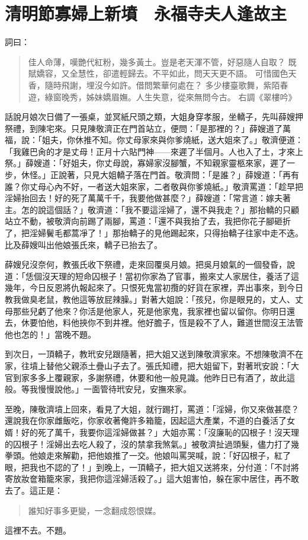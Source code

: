 
\chapter{清明節寡婦上新墳　永福寺夫人逢故主}

詞曰：
\begin{quote}
佳人命薄，嘆艷代紅粉，幾多黃土。豈是老天渾不管，好惡隨人自取？
既賦嬌容，又全慧性，卻遣輕歸去。不平如此，問天天更不語。
可惜國色天香，隨時飛謝，埋沒今如許。借問繁華何處在？
多少樓臺歌舞，紫陌春遊，綠窗晚秀，姊妹嬌眉嫵。人生失意，從來無問今古。
右調《翠樓吟》
\end{quote}

話說月娘次日備了一張桌，並冥紙尺頭之類，大姐身穿孝服，坐轎子，先叫薛嫂押祭禮，到陳宅來。只見陳敬濟正在門首站立，便問：「是那裡的？」薛嫂道了萬福，說：「姐夫，你休推不知。你丈母家來與你爹燒紙，送大姐來了。」敬濟便道：「我雞巴肏的才是丈母！正月十六貼門神——來遲了半個月。人也入了土，才來上祭。」薛嫂道：「好姐夫，你丈母說，寡婦家沒腳蟹，不知親家靈柩來家，遲了一步，休怪。」正說著，只見大姐轎子落在門首。敬濟問：「是誰？」薛嫂道：「再有誰？你丈母心內不好，一者送大姐來家，二者敬與你爹燒紙。」敬濟罵道：「趁早把淫婦抬回去！好的死了萬萬千千，我要他做甚麼？」薛嫂道：「常言道：嫁夫著主。怎的說這個話？」敬濟道：「我不要這淫婦了，還不與我走？」那抬轎的只顧站立不動，被敬濟向前踢了兩腳，罵道：「還不與我抬了去，我把你花子腳砸折了，把淫婦鬢毛都蒿凈了！」那抬轎子的見他踢起來，只得抬轎子往家中走不迭。比及薛嫂叫出他娘張氏來，轎子已抬去了。

薛嫂兒沒奈何，教張氏收下祭禮，走來回覆吳月娘。把吳月娘氣的一個發昏，說道：「恁個沒天理的短命囚根子！當初你家為了官事，搬來丈人家居住，養活了這幾年，今日反恩將仇報起來了。只恨死鬼當初攬的好貨在家裡，弄出事來，到今日教我做臭老鼠，教他這等放屁辣臊。」對著大姐說：「孩兒，你是眼見的，丈人、丈母那些兒虧了他來？你活是他家人，死是他家鬼，我家裡也留以留你。你明日還去，休要怕他，料他挾你不到井裡。他好膽子，恆是殺不了人，難道世間沒王法管他也怎的！」當晚不題。

到次日，一頂轎子，教玳安兒跟隨著，把大姐又送到陳敬濟家來。不想陳敬濟不在家，往墳上替他父親添土疊山子去了。張氏知禮，把大姐留下，對著玳安說：「大官到家多多上覆親家，多謝祭禮，休要和他一般見識。他昨日已有酒了，故此這般。等我慢慢說他。」一面管待玳安兒，安撫來家。

至晚，陳敬濟墳上回來，看見了大姐，就行踢打，罵道：「淫婦，你又來做甚麼？還說我在你家雌飯吃，你家收著俺許多箱籠，因起這大產業，不道的白養活了女婿！好的死了萬千，我要你這淫婦做甚？」大姐亦罵：「沒廉恥的囚根子！沒天理的囚根子！淫婦出去吃人殺了，沒的禁拿我煞氣。」被敬濟扯過頭髮，儘力打了幾拳頭。他娘走來解勸，把他娘推了一交。他娘叫罵哭喊，說：「好囚根子，紅了眼，把我也不認的了！」到晚上，一頂轎子，把大姐又送將來，分付道：「不討將寄放妝奩箱籠來家，我把你這淫婦活殺了。」這大姐害怕，躲在家中居住，再不敢去了。這正是：
\begin{quote}
誰知好事多更變，一念翻成怨恨媒。
\end{quote}
這裡不去。不題。

